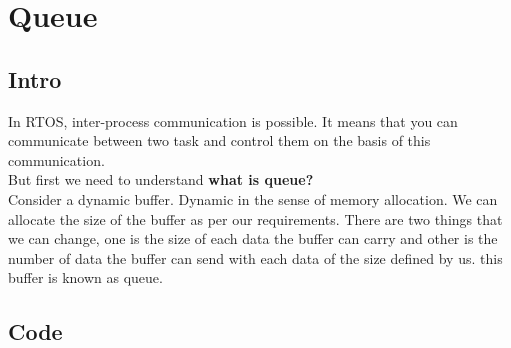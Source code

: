 \documentclass[11pt,a4paper]{article}
\begin{document}
	\section{Queue}
	 \subsection{Intro}
	 In RTOS, inter-process communication is possible. It means that you can communicate between two task and control them on the basis of this communication.\\ But first we need to understand \textbf {what is queue?}\\
	Consider a dynamic buffer. Dynamic in the sense of memory allocation. We can allocate the size of the buffer as per our requirements. There are two things that we can change, one is the size of each data the buffer can carry and other is the number of data the buffer can send with each data of the size defined by us. this buffer is known as queue.\\
	
	\subsection{Code}
	
	
\end{document}
